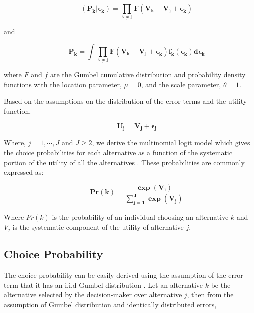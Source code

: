 \documentclass[a4paper,11pt]{article}
\begin{document}
\begin{itemize}
        \begin{equation*}
            \qquad \mathbf{(P_{k}|\epsilon_{k}) = \prod_{k \neq j} F(V_{k} - V_{j} + \epsilon_{k})}
        \end{equation*}

        and

        \begin{equation*}
            \qquad \mathbf{P_{k} = \int \prod_{k \neq j} F(V_{k} - V_{j} + \epsilon_{k})f_{k}(\epsilon_{k})d\epsilon_{k}}
        \end{equation*}

        where $F$ and $f$ are the Gumbel cumulative distribution and probability density functions with the location parameter, $\mu = 0$, and the scale parameter, $\theta = 1$.
    \end{itemize}

    Based on the assumptions on the distribution of the error terms and the utility function, 
    
    \begin{equation*}
        \qquad \mathbf{U_{j}} = \mathbf{V_{j}} + \mathbf{\epsilon_{j}}    
    \end{equation*}

    Where, $j = 1,\cdots, J$ and $J \ge 2$, we derive the multinomial logit model which gives the choice probabilities for each alternative as a function of the systematic portion of the utility of all the alternatives \cite{Koppelman&Bhat}. These probabilities are commonly expressed as:

    \begin{equation*}
        \qquad \mathbf{Pr(k) = \dfrac{\exp{\left(V_{i}\right)}}{\sum_{j=1}^{J}\exp{\left(V_{j}\right)}}}
    \end{equation*}

    Where $Pr(k)$ is the probability of an individual choosing an alternative $k$ and $V_{j}$ is the systematic component of the utility of alternative $j$.

\subsection{Choice Probability}
\label{subsec: MNL Choice Probability}

    The choice probability can be easily derived using the assumption of the error term that it has an i.i.d Gumbel distribution \cite{Croissant}. Let an alternative $k$ be the alternative selected by the decision-maker over alternative $j$, then from the assumption of Gumbel distribution and identically distributed errors,
\end{document}
